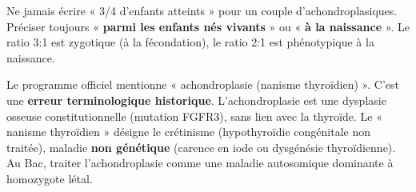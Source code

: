 \documentclass[11pt]{article}
\begin{document}
\begin{exoresolu}
\begin{enumerate}
\begin{itemize}
              \end{itemize}
    \end{enumerate}
    \begin{attention}
        Ne jamais écrire « 3/4 d'enfants atteints » pour un couple d'achondroplasiques. Préciser toujours « \textbf{parmi les enfants nés vivants} » ou « \textbf{à la naissance} ». Le ratio 3:1 est zygotique (à la fécondation), le ratio 2:1 est phénotypique à la naissance.
    \end{attention}
    \begin{savaistu}
        Le programme officiel mentionne « achondroplasie (nanisme thyroïdien) ». C'est une \textbf{erreur terminologique historique}. L'achondroplasie est une dysplasie osseuse constitutionnelle (mutation FGFR3), sans lien avec la thyroïde. Le « nanisme thyroïdien » désigne le crétinisme (hypothyroïdie congénitale non traitée), maladie \textbf{non génétique} (carence en iode ou dysgénésie thyroïdienne). Au Bac, traiter l'achondroplasie comme une maladie autosomique dominante à homozygote létal.
    \end{savaistu}
\end{exoresolu}
\end{document}
